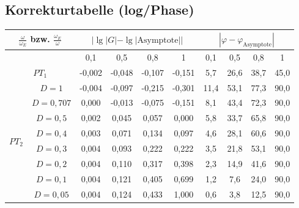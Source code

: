 \documentclass[12pt]{article}
\begin{document}
\subsection{Korrekturtabelle (log/Phase)}
\noindent\footnotesize
\setlength{\tabcolsep}{4pt}
\renewcommand{\arraystretch}{1.2}
\begin{tabular}{||c|c||cccc||cccc||}
\hline
\multicolumn{2}{|c|}{\(\frac{\omega}{\omega_E}\) bzw. \(\frac{\omega_E}{\omega}\)} &
\multicolumn{4}{c||}{\(|\lg|G|-\lg|\text{Asymptote}||\)} &
\multicolumn{4}{c||}{\(|\varphi-\varphi_{\text{Asymptote}}|\)} \\
\hline\hline
\multicolumn{2}{||c||}{} & 0,1 & 0,5 & 0,8 & 1 & 0,1 & 0,5 & 0,8 & 1 \\
\hline
\multicolumn{2}{||c||}{\(PT_1\)} & -0,002 & -0,048 & -0,107 & -0,151 & 5,7 & 26,6 & 38,7 & 45,0 \\
\hline
\multirow{8}{*}{\(PT_2\)} & \(D=1\) & -0,004 & -0,097 & -0,215 & -0,301 & 11,4 & 53,1 & 77,3 & 90,0 \\
 & \(D=0,707\) & 0,000 & -0,013 & -0,075 & -0,151 & 8,1 & 43,4 & 72,3 & 90,0 \\
 & \(D=0,5\) & 0,002 & 0,045 & 0,057 & 0,000 & 5,8 & 33,7 & 65,8 & 90,0 \\
 & \(D=0,4\) & 0,003 & 0,071 & 0,134 & 0,097 & 4,6 & 28,1 & 60,6 & 90,0 \\
 & \(D=0,3\) & 0,004 & 0,093 & 0,222 & 0,222 & 3,5 & 21,8 & 53,1 & 90,0 \\
 & \(D=0,2\) & 0,004 & 0,110 & 0,317 & 0,398 & 2,3 & 14,9 & 41,6 & 90,0 \\
 & \(D=0,1\) & 0,004 & 0,121 & 0,405 & 0,699 & 1,2 & 7,6 & 24,0 & 90,0 \\
 & \(D=0,05\) & 0,004 & 0,124 & 0,433 & 1,000 & 0,6 & 3,8 & 12,5 & 90,0 \\
\hline
\end{tabular}
\normalsize
\end{document}
